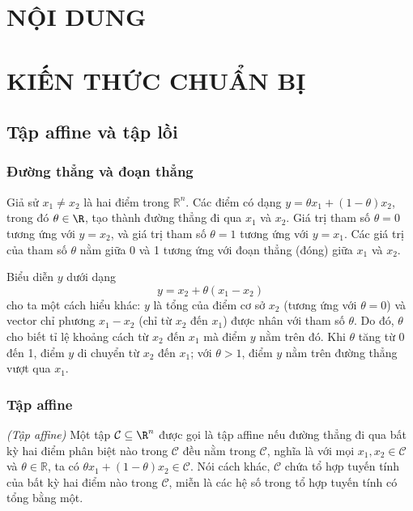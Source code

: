\newpage
\chapter*{\Large NỘI DUNG}
\chapter{KIẾN THỨC CHUẨN BỊ}

\section{Tập affine và tập lồi}
\label{section:affine_and_convex_sets}

\subsection{Đường thẳng và đoạn thẳng}
Giả sử $x_1 \neq x_2$ là hai điểm trong $\mathbb{R}^n$. Các điểm có dạng \(y = \theta x_1 + (1-\theta)x_2 \), trong đó $\theta \in \R$, tạo thành đường thẳng đi qua $x_1$ và $x_2$. Giá trị tham số $\theta = 0$ tương ứng với $y = x_2$, và giá trị tham số $\theta = 1$ tương ứng với $y = x_1$. Các giá trị của tham số $\theta$ nằm giữa 0 và 1 tương ứng với đoạn thẳng (đóng) giữa $x_1$ và $x_2$.

\noindent Biểu diễn $y$ dưới dạng
\begin{equation}
    y = x_2 + \theta(x_1 - x_2)
\end{equation}
cho ta một cách hiểu khác: $y$ là tổng của điểm cơ sở $x_2$ (tương ứng với $\theta = 0$) và vector chỉ phương $x_1 - x_2$ (chỉ từ $x_2$ đến $x_1$) được nhân với tham số $\theta$. Do đó, $\theta$ cho biết tỉ lệ khoảng cách từ $x_2$ đến $x_1$ mà điểm $y$ nằm trên đó. Khi $\theta$ tăng từ 0 đến 1, điểm $y$ di chuyển từ $x_2$ đến $x_1$; với $\theta > 1$, điểm $y$ nằm trên đường thẳng vượt qua $x_1$.

\subsection{Tập affine}
\begin{define}\textit{(Tập affine)}
    \label{define:affine_set}
    Một tập $\mathcal{C} \subseteq \R^n$ được gọi là tập affine nếu đường thẳng đi qua bất kỳ hai điểm phân biệt nào trong $\mathcal{C}$ đều nằm trong $\mathcal{C}$, nghĩa là với mọi $x_1, x_2 \in \mathcal{C}$ và $\theta \in \mathbb{R}$, ta có $\theta x_1 + (1-\theta)x_2 \in \mathcal{C}$. Nói cách khác, $\mathcal{C}$ chứa tổ hợp tuyến tính của bất kỳ hai điểm nào trong $\mathcal{C}$, miễn là các hệ số trong tổ hợp tuyến tính có tổng bằng một.
\end{define}

